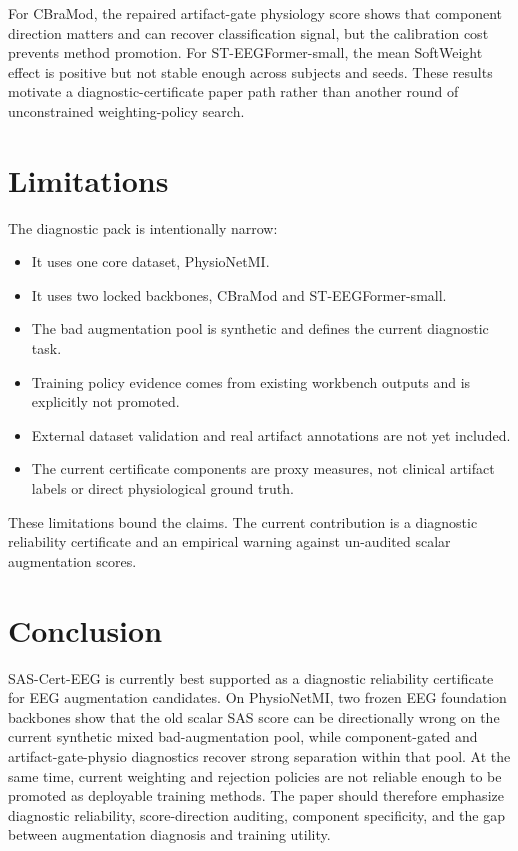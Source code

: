 \documentclass[11pt]{article}
\begin{document}
For CBraMod, the repaired artifact-gate physiology score shows that component direction matters and can recover classification signal, but the calibration cost prevents method promotion. For ST-EEGFormer-small, the mean SoftWeight effect is positive but not stable enough across subjects and seeds. These results motivate a diagnostic-certificate paper path rather than another round of unconstrained weighting-policy search.

\section{Limitations}

The diagnostic pack is intentionally narrow:

\begin{itemize}
\item It uses one core dataset, PhysioNetMI.
\item It uses two locked backbones, CBraMod and ST-EEGFormer-small.
\item The bad augmentation pool is synthetic and defines the current diagnostic task.
\item Training policy evidence comes from existing workbench outputs and is explicitly not promoted.
\item External dataset validation and real artifact annotations are not yet included.
\item The current certificate components are proxy measures, not clinical artifact labels or direct physiological ground truth.
\end{itemize}

These limitations bound the claims. The current contribution is a diagnostic reliability certificate and an empirical warning against un-audited scalar augmentation scores.

\section{Conclusion}

SAS-Cert-EEG is currently best supported as a diagnostic reliability certificate for EEG augmentation candidates. On PhysioNetMI, two frozen EEG foundation backbones show that the old scalar SAS score can be directionally wrong on the current synthetic mixed bad-augmentation pool, while component-gated and artifact-gate-physio diagnostics recover strong separation within that pool. At the same time, current weighting and rejection policies are not reliable enough to be promoted as deployable training methods. The paper should therefore emphasize diagnostic reliability, score-direction auditing, component specificity, and the gap between augmentation diagnosis and training utility.
\end{document}
